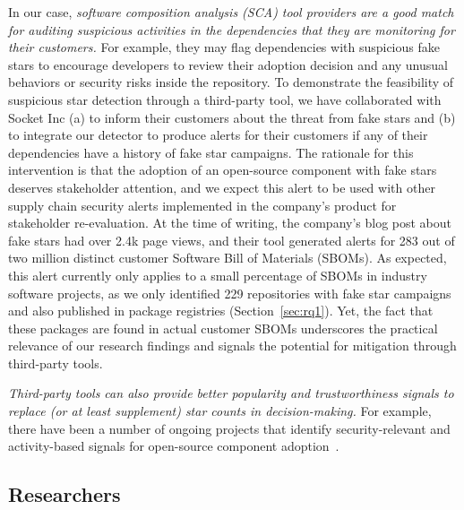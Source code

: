 In our case, \emph{software composition analysis (SCA) tool providers are a good match for auditing suspicious activities in the dependencies that they are monitoring for their customers.}
For example, they may flag dependencies with suspicious fake stars to encourage developers to review their adoption decision and any unusual behaviors or security risks inside the repository. 
To demonstrate the feasibility of suspicious star detection through a third-party tool, we have collaborated with Socket Inc (a) to inform their customers about the threat from fake stars and (b) to integrate our detector to produce alerts for their customers if any of their dependencies have a history of fake star campaigns.
The rationale for this intervention is that the adoption of an open-source component with fake stars deserves stakeholder attention,
and we expect this alert to be used with other supply chain security alerts implemented in the company's product for stakeholder re-evaluation.
At the time of writing, the company's blog post about fake stars had over 2.4k page views, and their tool generated alerts for 283 out of two million distinct customer Software Bill of Materials (SBOMs).
As expected, this alert currently only applies to a small percentage of SBOMs in industry software projects, as we only identified 229 repositories with fake star campaigns and also published in package registries (Section~\ref{sec:rq1}).
Yet, the fact that these packages are found in actual customer SBOMs underscores the practical relevance of our research findings and signals the potential for mitigation through third-party tools.

\emph{Third-party tools can also provide better popularity and trustworthiness signals to replace (or at least supplement) star counts in decision-making.}
For example, there have been a number of ongoing projects that identify security-relevant and activity-based signals for open-source component adoption~\cite[e.g.,][]{DBLP:journals/ieeesp/ZahanKHSW23}. %

\subsection{Researchers}

